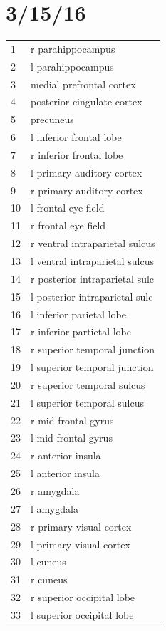 \documentclass[11pt]{article}
\begin{document}
\section{3/15/16}
\begin{table}
\tiny
\begin{tabular}{ll}
1 & r parahippocampus\\
2 & l parahippocampus\\
3 & medial prefrontal cortex\\
4 & posterior cingulate cortex\\
5 & precuneus\\
6 & l inferior frontal lobe\\
7 & r inferior frontal lobe\\
8 & l primary auditory cortex\\
9 & r primary auditory cortex\\
10 & l frontal eye field\\
11 & r frontal eye field\\
12 & r ventral intraparietal sulcus\\
13 & l ventral intraparietal sulcus\\
14 & r posterior intraparietal sulc\\
15 & l posterior intraparietal sulc\\
16 & l inferior parietal lobe\\
17 & r inferior partietal lobe\\
18 & r superior temporal junction\\
19 & l superior temporal junction\\
20 & r superior temporal sulcus\\
21 & l superior temporal sulcus\\
22 & r mid frontal gyrus\\
23 & l mid frontal gyrus\\
24 & r anterior insula\\
25 & l anterior insula\\
26 & r amygdala\\
27 & l amygdala\\
28 & r primary visual cortex\\
29 & l primary visual cortex\\
30 & l cuneus\\
31 & r cuneus\\
32 & r superior occipital lobe\\
33 & l superior occipital lobe\\
\end{tabular}
\end{table}
\end{document}
